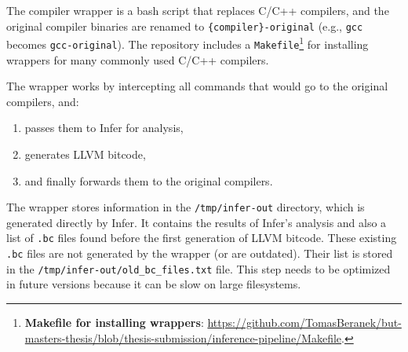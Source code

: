The compiler wrapper is a bash script that replaces C/C++ compilers, and the original compiler binaries are renamed to \texttt{\{compiler\}-original} (e.g., \texttt{gcc} becomes \texttt{gcc-original}). The repository includes a \texttt{Makefile}\footnote{\textbf{Makefile for installing wrappers}: \url{https://github.com/TomasBeranek/but-masters-thesis/blob/thesis-submission/inference-pipeline/Makefile}.} for installing wrappers for many commonly used C/C++ compilers.

The wrapper works by intercepting all commands that would go to the original compilers, and:
\begin{enumerate}
    \item passes them to Infer for analysis,
    \item generates LLVM bitcode,
    \item and finally forwards them to the original compilers.
\end{enumerate}

The wrapper stores information in the \texttt{/tmp/infer-out} directory, which is generated directly by Infer. It contains the results of Infer's analysis and also a list of \texttt{.bc} files found before the first generation of LLVM bitcode. These existing \texttt{.bc} files are not generated by the wrapper (or are outdated). Their list is stored in the \texttt{/tmp/infer-out/old\_bc\_files.txt} file. This step needs to be optimized in future versions because it can be slow on large filesystems.



